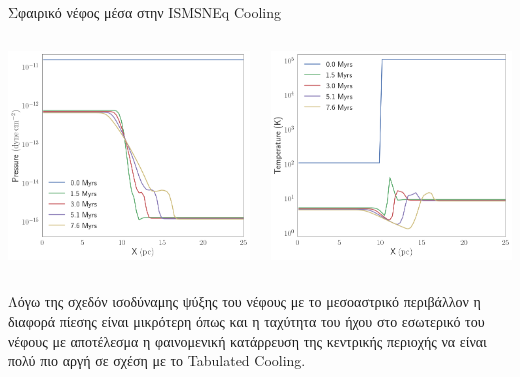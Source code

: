 \documentclass{beamer}
\begin{document}
\begin{frame}{Σφαιρικό νέφος μέσα στην ISM}{SNEq Cooling}
	\begin{columns}
			\begin{center}
				\includegraphics[width=1\linewidth]{../Document/DataImages/SNCoolingPRSprofile}
			\end{center}
			\begin{center}
				\includegraphics[width=1\linewidth]{../Document/DataImages/SNCoolingTMPprofile}
			\end{center}
	\end{columns}
Λόγω της σχεδόν ισοδύναμης ψύξης του νέφους με το μεσοαστρικό περιβάλλον η διαφορά πίεσης είναι μικρότερη όπως και η ταχύτητα του ήχου στο εσωτερικό του νέφους με αποτέλεσμα η φαινομενική κατάρρευση της κεντρικής περιοχής να είναι πολύ πιο αργή σε σχέση με το Tabulated Cooling.
\end{frame}
\end{document}
